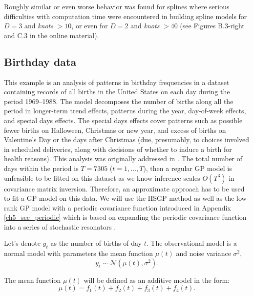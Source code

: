 \documentclass[onecolumn,a4paper,11pt]{article}
\begin{document}

Roughly similar or even worse behavior was found for splines where serious difficulties with computation time were encountered in building spline models for $D=3$ and \textit{knots} $> 10$, or even for $D=2$ and \textit{knots} $> 40$ (see Figures B.3-right and C.3 in the online material).


\subsection{Birthday data}\label{ch5_sec_birthday}
This example is an analysis of patterns in birthday frequencies in a dataset containing records of all births in the United States on each day during the period 1969–1988. The model decomposes the number of births along all the period in longer-term trend effects, patterns during the year, day-of-week effects, and special days effects. The special days effects cover patterns such as possible fewer births on Halloween, Christmas or new year, and excess of births on Valentine’s Day or the days after Christmas (due, presumably, to choices involved in scheduled deliveries, along with decisions of whether to induce a birth for health reasons). This analysis was originally addressed in \cite{gelman2013bayesian}. The total number of days within the period is $T=7305$ ($t=1,\dots,T$), then a regular GP model is unfeasible to be fitted on this dataset as we know inference scales $O(T^3)$ in covariance matrix inversion. 
Therefore, an approximate approach has to be used to fit a GP model on this data. We will use the HSGP method as well as the low-rank GP model with a periodic covariance function introduced in Appendix \ref{ch5_sec_periodic} which is based on expanding the periodic covariance function into a series of stochastic resonators \citep{solin2014explicit}.

Let's denote $y_t$ as the number of births of day $t$. The observational model is a normal model with parameters the mean function $\mu(t)$ and noise variance $\sigma^2$,
%
\begin{equation*}
y_{t} \sim \mathcal{N}(\mu(t),\sigma^2).
\end{equation*}

\noindent The mean function $\mu(t)$ will be defined as an additive model in the form: 
%
\begin{equation} \label{ch5_eq_mean_brithday}
\mu(t) = f_1(t) + f_2(t) + f_3(t) + f_4(t).
\end{equation}
\end{document}
